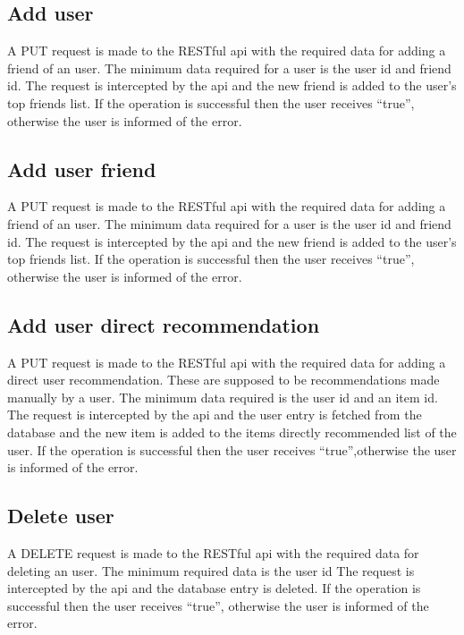 \subsection{Add user}
\label{sec:workflow-add-user}
A PUT request is made to the RESTful api with the required data for adding a friend of an user.
The minimum data required for a user is the user id and friend id.
The request is intercepted by the api and the new friend is added to the user’s top friends list. If the operation is successful then the user receives “true”, otherwise the user is informed of the error. 

\subsection{Add user friend}
\label{sec:workflow-add-user-friend}
A PUT request is made to the RESTful api with the required data for adding a friend of an user.
The minimum data required for a user is the user id and friend id.
The request is intercepted by the api and the new friend is added to the user’s top friends list. If the operation is successful then the user receives “true”, otherwise the user is informed of the error. 

\subsection{Add user direct recommendation}
\label{sec:workflow-add-user-direct-recommendation}
A PUT request is made to the RESTful api with the required data for adding a direct user recommendation.
These are supposed to be recommendations made manually by a user.
The minimum data required is the user id and an item id.
The request is intercepted by the api and the user entry is fetched from the database and the new item is added to the items directly recommended list of the user. If the operation is successful then the user receives “true”,otherwise the user is informed of the error. 

\subsection{Delete user}
\label{sec:workflow-delete-user}
A DELETE request is made to the RESTful api with the required data for deleting an user.
The minimum required data is the user id
The request is intercepted by the api and the database entry is deleted. If the operation is successful then the user receives “true”, otherwise the user is informed of the error. 

